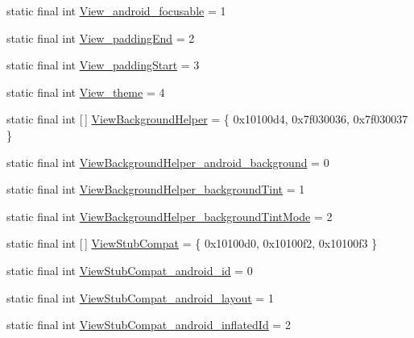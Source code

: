 \begin{DoxyCompactItemize}
\item 
static final int \mbox{\hyperlink{classandroid_1_1support_1_1v7_1_1appcompat_1_1_r_1_1styleable_a312f53078ad7e72668c30818eb36f4d5}{View\+\_\+android\+\_\+focusable}} = 1
\item 
static final int \mbox{\hyperlink{classandroid_1_1support_1_1v7_1_1appcompat_1_1_r_1_1styleable_ab97189cfc89b78ea06021e2de56df41b}{View\+\_\+padding\+End}} = 2
\item 
static final int \mbox{\hyperlink{classandroid_1_1support_1_1v7_1_1appcompat_1_1_r_1_1styleable_ac503580e2e9b985ce96f033596ac9a31}{View\+\_\+padding\+Start}} = 3
\item 
static final int \mbox{\hyperlink{classandroid_1_1support_1_1v7_1_1appcompat_1_1_r_1_1styleable_a6ff12e56eb22350fa07942cc5e70ab5a}{View\+\_\+theme}} = 4
\item 
static final int \mbox{[}$\,$\mbox{]} \mbox{\hyperlink{classandroid_1_1support_1_1v7_1_1appcompat_1_1_r_1_1styleable_a41b23c720259f27b563271bda1b5767a}{View\+Background\+Helper}} = \{ 0x10100d4, 0x7f030036, 0x7f030037 \}
\item 
static final int \mbox{\hyperlink{classandroid_1_1support_1_1v7_1_1appcompat_1_1_r_1_1styleable_a5964669ca9aa4257bb4ee0b74c819596}{View\+Background\+Helper\+\_\+android\+\_\+background}} = 0
\item 
static final int \mbox{\hyperlink{classandroid_1_1support_1_1v7_1_1appcompat_1_1_r_1_1styleable_a0cb0c8e242c16e1370ae67bc0f2977e0}{View\+Background\+Helper\+\_\+background\+Tint}} = 1
\item 
static final int \mbox{\hyperlink{classandroid_1_1support_1_1v7_1_1appcompat_1_1_r_1_1styleable_a6611327290a47817f92d3cd27e5ed123}{View\+Background\+Helper\+\_\+background\+Tint\+Mode}} = 2
\item 
static final int \mbox{[}$\,$\mbox{]} \mbox{\hyperlink{classandroid_1_1support_1_1v7_1_1appcompat_1_1_r_1_1styleable_a59b69ba1b80ee4157819f6b964a66358}{View\+Stub\+Compat}} = \{ 0x10100d0, 0x10100f2, 0x10100f3 \}
\item 
static final int \mbox{\hyperlink{classandroid_1_1support_1_1v7_1_1appcompat_1_1_r_1_1styleable_a5321961e015b50c6ca753c1e84a8ad5d}{View\+Stub\+Compat\+\_\+android\+\_\+id}} = 0
\item 
static final int \mbox{\hyperlink{classandroid_1_1support_1_1v7_1_1appcompat_1_1_r_1_1styleable_a1850da4fab00e8c58cb80eccbffa9339}{View\+Stub\+Compat\+\_\+android\+\_\+layout}} = 1
\item 
static final int \mbox{\hyperlink{classandroid_1_1support_1_1v7_1_1appcompat_1_1_r_1_1styleable_a97435b8e5b04b2c3db3118b09480f403}{View\+Stub\+Compat\+\_\+android\+\_\+inflated\+Id}} = 2
\end{DoxyCompactItemize}
